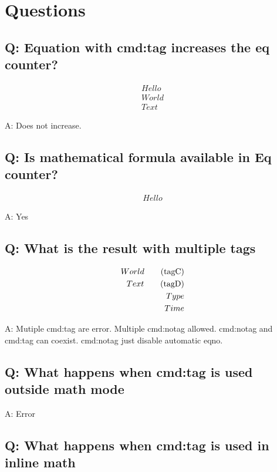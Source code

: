 \documentclass[11pt]{revtex4-1}
\begin{document}
\section{Questions}
\subsection*{Q: Equation with cmd:tag increases the eq counter?}

\begin{align}
  Hello \\
  World \tag{hello} \\
  Text
\end{align}

A: Does not increase.

\subsection*{Q: Is mathematical formula available in Eq counter?}
\begin{align}
  Hello \tag{$\frac12$}
\end{align}

A: Yes

\subsection*{Q: What is the result with multiple tags}
\begin{align}
  World \notag \tag{tagC} \\
  Text \tag{tagD} \notag \\
  Type \notag \notag \\
  Time
\end{align}

A: Mutiple cmd:tag are error. Multiple cmd:notag allowed. cmd:notag and cmd:tag can coexist. cmd:notag just disable automatic eqno.

\subsection*{Q: What happens when cmd:tag is used outside math mode}


A: Error

\subsection*{Q: What happens when cmd:tag is used in inline math}
\end{document}
